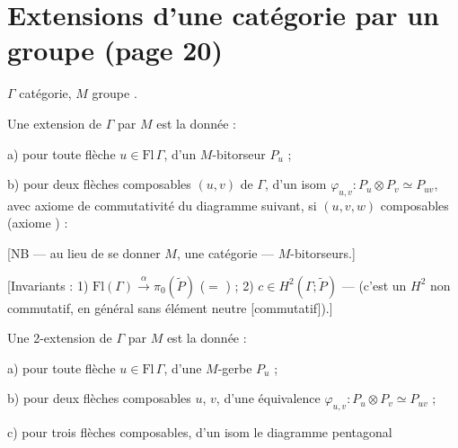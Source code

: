 \documentclass[11pt,a4paper]{article}
\begin{document}
\section*{Extensions d'une catégorie par un groupe (page 20)}

$\Gamma$ catégorie, $M$ groupe \struck{\ill}.

Une extension de $\Gamma$ par $M$ est la donnée :

a) pour toute flèche $u \in \mathrm{Fl}\,\Gamma$, d'un $M$-bitorseur $P_u$ ;

b) pour deux flèches composables $(u,v)$ de $\Gamma$, d'un isom
$\varphi_{u,v} : P_u \otimes P_v \simeq P_{uv}$, avec axiome de
commutativité du diagramme suivant, si $(u,v,w)$ composables (axiome
) :



[NB — au lieu de se donner $M$,  une
catégorie   —  $M$-bitorseurs.]

[Invariants : 1) $\mathrm{Fl}(\Gamma) \xrightarrow{\ \alpha\ }
\pi_0(\widetilde{P})$ ($=$ ) ; 2)
$c \in H^2(\Gamma ; \widetilde{P})$ — (c'est un $H^2$ non commutatif, en
général sans élément neutre \struck{\ill} [commutatif]).]

Une 2-extension de $\Gamma$ par $M$ est la donnée :

a) pour toute flèche $u \in \mathrm{Fl}\,\Gamma$, d'une $M$-gerbe $P_u$ ;

b) pour deux flèches composables $u$, $v$, d'une équivalence
$\varphi_{u,v} : P_u \otimes P_v \simeq P_{uv}$ ;

c) pour trois flèches composables, d'un isom  le diagramme pentagonal
\end{document}

